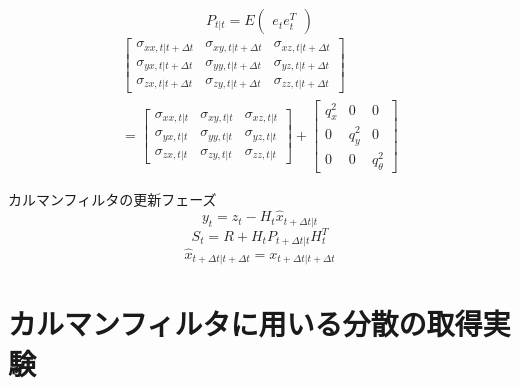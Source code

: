 \documentclass[a4paper]{article}
\begin{document}
\begin{equation}
    P_{t|t} = E
    \begin{pmatrix}
        e_{t} e_{t}^{T}
    \end{pmatrix}
    \label{eq:5}
\end{equation}
%
%
\begin{equation}
    \begin{split}
    \begin{bmatrix}
    \sigma_{xx,t|t+\Delta t} &\sigma_{xy,t|t+\Delta t} &\sigma_{xz,t|t+\Delta t} \\
    \sigma_{yx,t|t+\Delta t} &\sigma_{yy,t|t+\Delta t} &\sigma_{yz,t|t+\Delta t} \\
    \sigma_{zx,t|t+\Delta t} &\sigma_{zy,t|t+\Delta t} &\sigma_{zz,t|t+\Delta t} 
    \end{bmatrix} \\
    = 
    \begin{bmatrix}
        \sigma_{xx,t|t} &\sigma_{xy,t|t} &\sigma_{xz,t|t} \\
        \sigma_{yx,t|t} &\sigma_{yy,t|t} &\sigma_{yz,t|t} \\
        \sigma_{zx,t|t} &\sigma_{zy,t|t} &\sigma_{zz,t|t}
    \end{bmatrix} 
    +
    \begin{bmatrix}
        q_{x}^{2} &0         &0 \\
        0         &q_{y}^{2} &0 \\
        0         &0         &q_{\theta}^{2}
    \end{bmatrix}
\end{split}
    \label{eq:6} 
\end{equation}

カルマンフィルタの更新フェーズ
\begin{equation}
    y_{t} = z_{t} - H_{t}\hat{x}_{t+\Delta t|t}
    \label{eq:7}
\end{equation}
%
%
\begin{equation}
    S_{t} = R + H_{t}P_{t+\Delta t|t}H_{t}^{T}
    \label{eq:8}
\end{equation}
%
%
\begin{equation}
    \hat{x}_{t+\Delta t|t+\Delta t} = x_{t+\Delta t|t+\Delta t}
    \label{eq:9}
\end{equation}



\section{カルマンフィルタに用いる分散の取得実験}
\end{document}
